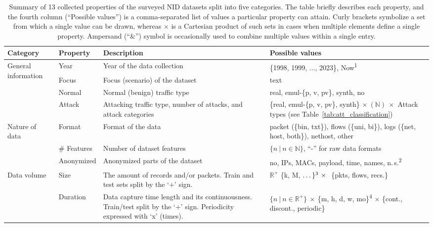 \begin{table*}[t]
    \centering
    \renewcommand{\arraystretch}{1.1}
    \caption{Summary of 13 collected properties of the surveyed NID datasets split into five categories. The table briefly describes each property, and the fourth column (``Possible values'') is a comma-separated list of values a particular property can attain. Curly brackets symbolize a set from which a single value can be drawn, whereas $\times$ is a Cartesian product of such sets in cases when multiple elements define a single property. Ampersand (``\&'') symbol is occasionally used to combine multiple values within a single entry.}
    \vspace*{0.4em}
    \begin{tabular}{p{1.9cm} p{1.85cm} p{5.9cm} p{7cm}}
    \textbf{Category} & \textbf{Property} & \textbf{Description} & \textbf{Possible values} \\ \toprule
    
    \multirow{4}{2cm}[-.5\baselineskip]{\centering General information}
     & Year & Year of the data collection & \{1998, 1999, $\dots$, 2023\}, Now\textsuperscript{1} \\
     & Focus & Focus (scenario) of the dataset & text \\
     & Normal & Normal (benign) traffic type & real, emul-\{p, v, pv\}, synth, no \\
     & Attack & Attacking traffic type, number of attacks, and attack categories & \makecell[tl]{\{real, emul-\{p, v, pv\}, synth\} $\times\ (\mathbb{N})\ \times$ \\Attack types (see Table~\ref{tab:att_classification})} \\ \midrule

    \multirow{3}{2cm}[-.5\baselineskip]{\centering Nature of data}
     & Format & Format of the data & packet (\{bin, txt\}), flows (\{uni, bi\}), logs (\{net, host, both\}), nethost, other \\
     & \# Features & Number of dataset features & $\{n\ |\ n \in \mathbb{N}\}$, ``-'' for raw data formats \\
     & Anonymized & Anonymized parts of the dataset & no, IPs, MACs, payload, time, names, n.\,s.\textsuperscript{2} \\ \midrule

    \multirow{4}{2cm}[-.5\baselineskip]{\centering Data volume}
     & Size & The amount of records and/or packets. Train and test sets split by the `$+$' sign. & $\mathbb{R}^+$ \{k, M, $\dots\}\textsuperscript{3}\ \times\ $  \{pkts, flows, recs.\}\\
     & Duration & Data capture time length and its continuousness. Train/test split by the `+' sign. Periodicity expressed with `x' (times). & $\{n\ |\ n \in \mathbb{R}^+\}\ \times\ $\{m, h, d, w, mo\}\textsuperscript{4} $\times$ \{cont., discont., periodic\}\\ \midrule


\end{tabular}
\end{table*}
